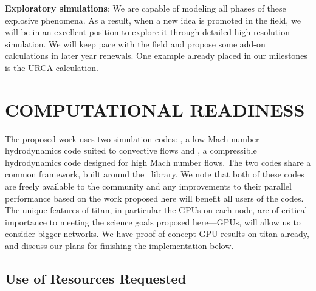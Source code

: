 \documentclass[11pt,letterpaper,english]{article}
\begin{document}
{\bf Exploratory simulations}:
%
We are
capable of modeling all phases of these explosive phenomena.  As a
result, when a new idea is promoted in the field, we will be in an
excellent position to explore it through detailed high-resolution
simulation.  We will keep pace with the field and propose some add-on
calculations in later year renewals.  One example already placed in
our milestones is the URCA calculation.




\section{COMPUTATIONAL READINESS}




The proposed work uses two simulation codes: \maestro, a low Mach
number hydrodynamics code suited to convective flows and \castro, a
compressible hydrodynamics code designed for high Mach number flows.
The two codes share a common framework, built around the
\boxlib\ library.  We note that both of these codes are freely
available to the community and any improvements to their parallel
performance based on the work proposed here will benefit all users of
the codes.  The unique features of titan, in particular the GPUs on each
node, are of critical importance to meeting the science goals proposed here---GPUs,
will allow us to consider bigger networks. 
We have proof-of-concept GPU results on titan already, and discuss our plans
for finishing the implementation below.


\subsection{Use of Resources Requested}

\end{document}
